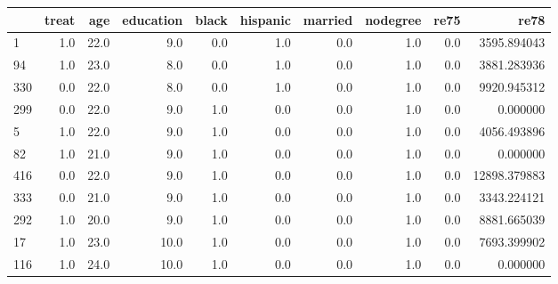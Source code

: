 \begin{tabular}{lrrrrrrrrr}
\toprule
{} &  treat &   age &  education &  black &  hispanic &  married &  nodegree &  re75 &          re78 \\
\midrule
1   &    1.0 &  22.0 &        9.0 &    0.0 &       1.0 &      0.0 &       1.0 &   0.0 &   3595.894043 \\
94  &    1.0 &  23.0 &        8.0 &    0.0 &       1.0 &      0.0 &       1.0 &   0.0 &   3881.283936 \\
330 &    0.0 &  22.0 &        8.0 &    0.0 &       1.0 &      0.0 &       1.0 &   0.0 &   9920.945312 \\
299 &    0.0 &  22.0 &        9.0 &    1.0 &       0.0 &      0.0 &       1.0 &   0.0 &      0.000000 \\
5   &    1.0 &  22.0 &        9.0 &    1.0 &       0.0 &      0.0 &       1.0 &   0.0 &   4056.493896 \\
82  &    1.0 &  21.0 &        9.0 &    1.0 &       0.0 &      0.0 &       1.0 &   0.0 &      0.000000 \\
416 &    0.0 &  22.0 &        9.0 &    1.0 &       0.0 &      0.0 &       1.0 &   0.0 &  12898.379883 \\
333 &    0.0 &  21.0 &        9.0 &    1.0 &       0.0 &      0.0 &       1.0 &   0.0 &   3343.224121 \\
292 &    1.0 &  20.0 &        9.0 &    1.0 &       0.0 &      0.0 &       1.0 &   0.0 &   8881.665039 \\
17  &    1.0 &  23.0 &       10.0 &    1.0 &       0.0 &      0.0 &       1.0 &   0.0 &   7693.399902 \\
116 &    1.0 &  24.0 &       10.0 &    1.0 &       0.0 &      0.0 &       1.0 &   0.0 &      0.000000 \\
\bottomrule
\end{tabular}
